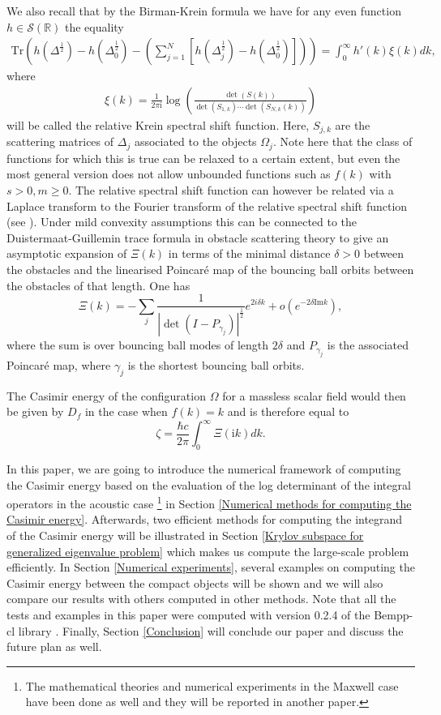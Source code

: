 We also recall that by the Birman-Krein formula we have for any even function $h \in \mathcal{S}(\mathbb{R})$ the equality
\begin{align}\label{B-K formula}
    \text{Tr}\left(h(\Delta^{\frac{1}{2}}) - h(\Delta_{0}^{\frac{1}{2}}) - \left(\sum_{j = 1}^{N}[h(\Delta_{j}^{\frac{1}{2}}) - h(\Delta_{0}^{\frac{1}{2}})]\right)\right)  = \int_{0}^{\infty}h'(k)\xi(k)dk,
\end{align}
where 
\begin{align*}
    \xi(k) = \frac{1}{2\pi \mathrm{i}}\log\left(\frac{\det(S(k))}{\det(S_{1,k})\cdots\det(S_{N,k}(k))}\right)
\end{align*}
will be called the relative Krein spectral shift function. Here, $S_{j,k}$ are the scattering matrices of $\Delta_{j}$ associated to the objects $\Omega_{j}$. Note here that the class of functions for which this is true can be relaxed to a certain extent, but even the most general version does not allow unbounded functions such as $f(k)$ with $s>0, m\geq 0$.
The relative spectral shift function can however be related via a Laplace transform to the Fourier transform of the relative spectral shift function (see \cite{MR4396069}). Under mild convexity assumptions this can be connected to the Duistermaat-Guillemin trace formula in obstacle scattering theory to give an asymptotic expansion of  $\Xi(k)$ 
in terms of the minimal distance $\delta>0$ between the obstacles and the linearised Poincar\'e map of the bouncing ball orbits between the obstacles of that length. One has
$$
 \Xi(k) =- \sum_{j} \frac{1}{|\det(I - P_{\gamma_j})|^{\frac{1}{2}}} e^{2 i \delta k} + o(e^{- 2 \delta \text{Im}{k}}),
$$
where the sum is over  bouncing ball modes of length $2 \delta$ and $P_{\gamma_j}$ is the associated Poincar\'e map, where $\gamma_{j}$ is the shortest bouncing ball orbits. 

The Casimir energy of the configuration $\Omega$ for a massless scalar field would then be given by $D_f$ in the case when $f(k)=k$ and is therefore equal to
$$
\zeta = \frac{\hbar c}{2 \pi} \int _{0}^{\infty} \Xi(\mathrm{i}k) dk.
$$

In this paper, we are going to introduce the numerical framework of computing the Casimir energy based on the evaluation of the log determinant of the integral 
operators in the acoustic case \footnote{The mathematical theories and numerical experiments in the Maxwell case have been done as well and they will be 
reported in another paper.} in Section \ref{Numerical methods for computing the Casimir energy}. Afterwards,
two efficient methods for computing the integrand of the Casimir energy will be illustrated in Section \ref{Krylov subspace for generalized eigenvalue problem}
which makes us compute the large-scale problem efficiently. In Section \ref{Numerical experiments}, several examples on computing the Casimir energy between 
the compact objects will be shown and we will also compare our results with others computed in other methods. Note that all the tests and examples in this paper were computed 
with version 0.2.4 of the Bempp-cl library \cite{scroggs2017software}. Finally, Section \ref{Conclusion} will conclude 
our paper and discuss the future plan as well.

